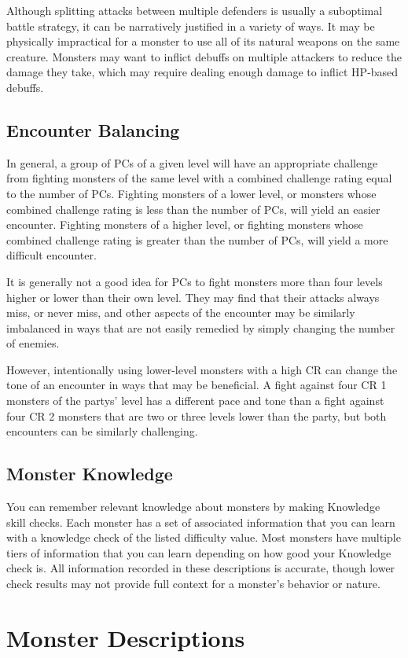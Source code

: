         Although splitting attacks between multiple defenders is usually a suboptimal battle strategy, it can be narratively justified in a variety of ways.
        It may be physically impractical for a monster to use all of its natural weapons on the same creature.
        Monsters may want to inflict debuffs on multiple attackers to reduce the damage they take, which may require dealing enough damage to inflict HP-based debuffs.

    \subsection{Encounter Balancing}\label{Encounter Balancing}
        In general, a group of PCs of a given level will have an appropriate challenge from fighting monsters of the same level with a combined challenge rating equal to the number of PCs.
        Fighting monsters of a lower level, or monsters whose combined challenge rating is less than the number of PCs, will yield an easier encounter.
        Fighting monsters of a higher level, or fighting monsters whose combined challenge rating is greater than the number of PCs, will yield a more difficult encounter.

        It is generally not a good idea for PCs to fight monsters more than four levels higher or lower than their own level.
        They may find that their attacks always miss, or never miss, and other aspects of the encounter may be similarly imbalanced in ways that are not easily remedied by simply changing the number of enemies.

        However, intentionally using lower-level monsters with a high CR can change the tone of an encounter in ways that may be beneficial.
        A fight against four CR 1 monsters of the partys' level has a different pace and tone than a fight against four CR 2 monsters that are two or three levels lower than the party, but both encounters can be similarly challenging.

    \subsection{Monster Knowledge}
        You can remember relevant knowledge about monsters by making Knowledge skill checks.
        Each monster has a set of associated information that you can learn with a knowledge check of the listed difficulty value.
        Most monsters have multiple tiers of information that you can learn depending on how good your Knowledge check is.
        All information recorded in these descriptions is accurate, though lower check results may not provide full context for a monster's behavior or nature.

\section{Monster Descriptions}


